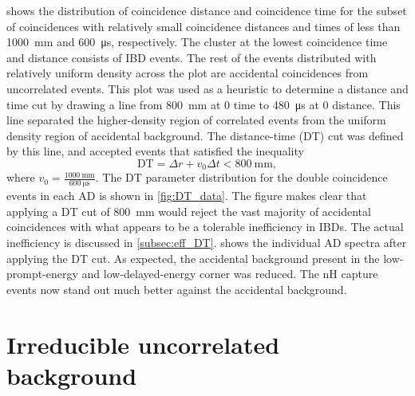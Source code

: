  shows the distribution of
coincidence distance and coincidence time
for the subset of  coincidences with
relatively small coincidence distances and times
of less than \SI{1000}{\milli\meter} and \SI{600}{\micro\second},
respectively.
The cluster at the lowest coincidence time and distance
consists of IBD events.
The rest of the events distributed with relatively uniform density
across the plot are accidental coincidences from uncorrelated events.
This plot was used as a heuristic to determine a distance and time cut
by drawing a line from \SI{800}{\milli\meter} at $0$ time
to \SI{480}{\micro\second} at $0$ distance.
This line separated the higher-density region
of correlated events from the uniform density region of accidental background.
The distance-time (DT) cut was defined by this line,
and accepted events that satisfied the inequality
\begin{equation}\label{eq:DT}
    \text{DT} = \Delta r + v_0 \Delta t < \SI{800}{\milli\meter},
\end{equation}
where $v_0 = \frac{\SI{1000}{\milli\meter}}{\SI{600}{\micro\second}}$.
The DT parameter distribution for the double coincidence events
in each AD is shown in \cref{fig:DT_data}.
The figure makes clear that applying a DT cut of \SI{800}{\mm}
would reject the vast majority of accidental coincidences
with what appears to be a tolerable inefficiency in IBDs.
The actual inefficiency is discussed in \cref{subsec:eff_DT}.
 shows the individual AD spectra
after applying the DT cut.
As expected, the accidental background present
in the low-prompt-energy and low-delayed-energy corner was reduced.
The nH capture events now stand out much better
against the accidental background.

\section{Irreducible uncorrelated background}
\label{sec:acc}

